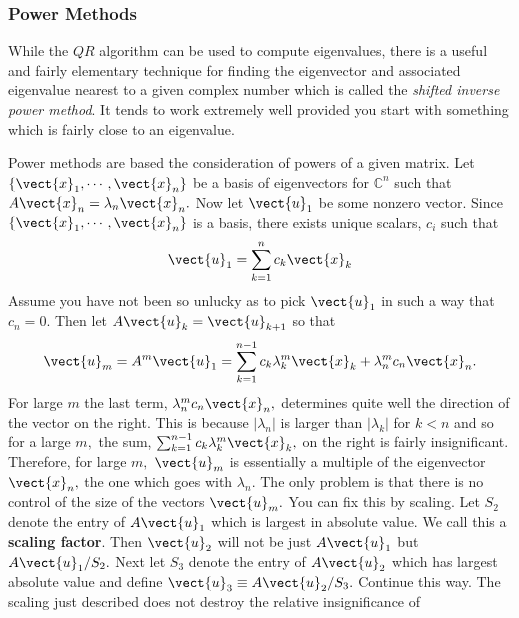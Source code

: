 \subsubsection{Power Methods}

While the $QR$ algorithm can be used to compute eigenvalues, there is a useful and fairly elementary technique for
finding the eigenvector and associated eigenvalue nearest to a given complex number which
is called the {\em shifted inverse power method}. It tends to work extremely well provided you
start with something which is fairly close to an eigenvalue.

Power methods are based the consideration of powers of a given matrix. Let $
\left\{ 
\vect{x}_{1},\cdots ,\vect{x}_{n}\right\} $ be a basis of eigenvectors for $
\mathbb{C}^{n}$ such that $A\vect{x}_{n}=\lambda _{n}\vect{x}_{n}.$ Now let $
\vect{u}_{1}$ be some nonzero vector. Since $\left\{ \vect{x}_{1},\cdots ,\vect{x}_{n}\right\} $ is a basis, there exists unique scalars, $c_{i}$ such that 
\begin{equation*}
\vect{u}_{1}=\sum_{k=1}^{n}c_{k}\vect{x}_{k}
\end{equation*}
Assume you have not been so unlucky as to pick $\vect{u}_{1}$ in such a way
that $c_{n}=0.$ Then let $A\vect{u}_{k}=\vect{u}_{k+1}$ so that 
\begin{equation}
\vect{u}_{m}=A^{m}\vect{u}_{1}=\sum_{k=1}^{n-1}c_{k}\lambda _{k}^{m}\vect{x}
_{k}+\lambda _{n}^{m}c_{n}\vect{x}_{n}.  \label{20maye1}
\end{equation}
For large $m$ the last term, $\lambda _{n}^{m}c_{n}\vect{x}_{n},$ determines
quite well the direction of the vector on the right. This is because $
\left\vert \lambda _{n}\right\vert $ is larger than $\left\vert \lambda
_{k}\right\vert $ for $k<n$ and so for a large $m,$ the sum, $\sum_{k=1}^{n-1}c_{k}\lambda _{k}^{m}\vect{x}_{k},$ on the right is fairly
insignificant. Therefore, for large $m,$ $\vect{u}_{m}$ is essentially a
multiple of the eigenvector $\vect{x}_{n},$ the one which goes with $\lambda
_{n}.$ The only problem is that there is no control of the size of the
vectors $\vect{u}_{m}.$ You can fix this by scaling. Let $S_{2}$ denote the
entry of $A\vect{u}_{1}$ which is largest in absolute value. We call this a 
 \textbf{scaling factor}. Then $\vect{u}_{2}$ will not be just $A\vect{u}_{1}$ but $A\vect{u}_{1}/S_{2}.$ Next
let $S_{3}$ denote the entry of $A\vect{u}_{2}$ which has largest absolute
value and define $\vect{u}_{3}\equiv A\vect{u}_{2}/S_{3}.$ Continue this way.
The scaling just described does not destroy the relative insignificance of
